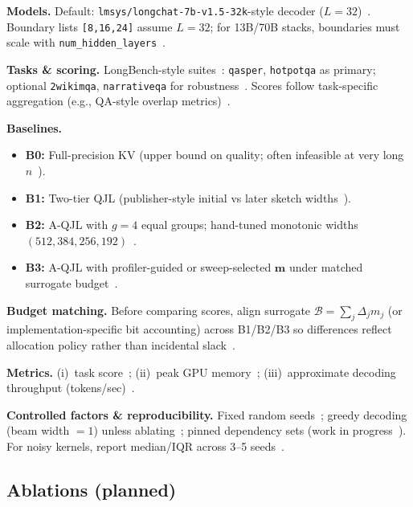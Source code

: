 \documentclass[conference]{IEEEtran}
\begin{document}
\textbf{Models.} Default: \texttt{lmsys/longchat-7b-v1.5-32k}-style decoder ($L{=}32$)~\cite{touvron2023llama}. Boundary lists \texttt{[8,16,24]} assume $L{=}32$; for 13B/70B stacks, boundaries must scale with \texttt{num\_hidden\_layers}~\cite{touvron2023llama}.

\textbf{Tasks \& scoring.} LongBench-style suites~\cite{bai2023longbench}: \texttt{qasper}, \texttt{hotpotqa} as primary; optional \texttt{2wikimqa}, \texttt{narrativeqa} for robustness~\cite{presentation_mqjl}. Scores follow task-specific aggregation (e.g., QA-style overlap metrics)~\cite{bai2023longbench}.

\textbf{Baselines.}
\begin{itemize}
\item \textbf{B0:} Full-precision KV (upper bound on quality; often infeasible at very long $n$~\cite{touvron2023llama}).
\item \textbf{B1:} Two-tier QJL (publisher-style initial vs later sketch widths~\cite{zandieh2024qjl,qjlkernel}).
\item \textbf{B2:} A-QJL with $g{=}4$ equal groups; hand-tuned monotonic widths $(512,384,256,192)$~\cite{presentation_mqjl,zandieh2024aqjl-repo}.
\item \textbf{B3:} A-QJL with profiler-guided or sweep-selected \(\mathbf{m}\) under matched surrogate budget~\cite{presentation_mqjl}.
\end{itemize}

\textbf{Budget matching.} Before comparing scores, align surrogate \(\mathcal{B}=\sum_j \Delta_j m_j\) (or implementation-specific bit accounting) across B1/B2/B3 so differences reflect allocation policy rather than incidental slack~\cite{presentation_mqjl}.

\textbf{Metrics.} (i)~task score~\cite{bai2023longbench}; (ii)~peak GPU memory~\cite{presentation_mqjl}; (iii)~approximate decoding throughput (tokens/sec)~\cite{presentation_mqjl}.

\textbf{Controlled factors \& reproducibility.} Fixed random seeds~\cite{presentation_mqjl}; greedy decoding (beam width \(=1\)) unless ablating~\cite{presentation_mqjl}; pinned dependency sets (work in progress~\cite{presentation_mqjl}). For noisy kernels, report median/IQR across 3--5 seeds~\cite{presentation_mqjl}.

\subsection{Ablations (planned)}
\end{document}
